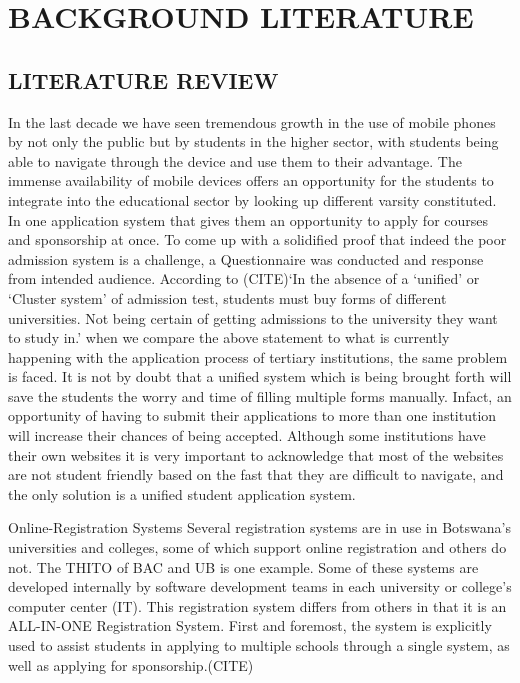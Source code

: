 \chapter{BACKGROUND LITERATURE}


\section{LITERATURE REVIEW}
In the last decade we have seen tremendous growth in the use of mobile phones by not only the public but by students in the higher sector, with students being able to navigate through the device and use them to their advantage. The immense availability of mobile devices offers an opportunity for the students to integrate into the educational sector by looking up different varsity constituted. In one application system that gives them an opportunity to apply for courses and sponsorship at once. To come up with a solidified proof that indeed the poor admission system is a challenge, a Questionnaire was conducted and response from intended audience. According to (CITE)‘In the absence of a ‘unified’ or ‘Cluster system’ of admission test, students must buy forms of different universities. Not being certain of getting admissions to the university they want to study in.’ when we compare the above statement to what is currently happening with the application process of tertiary institutions, the same problem is faced. It is not by doubt that a unified system which is being brought forth will save the students the worry and time of filling multiple forms manually. Infact, an opportunity of having to submit their applications to more than one institution will increase their chances of being accepted. Although some institutions have their own websites it is very important to acknowledge that most of the websites are not student friendly based on the fast that they are difficult to navigate, and the only solution is a unified student application system.

Online-Registration Systems 
Several registration systems are in use in Botswana's universities and colleges, some of which support online registration and others do not. The THITO of BAC and UB is one example. Some of these systems are developed internally by software development teams in each university or college's computer center (IT). This registration system differs from others in that it is an ALL-IN-ONE Registration System. First and foremost, the system is explicitly used to assist students in applying to multiple schools through a single system, as well as applying for sponsorship.(CITE)\\

